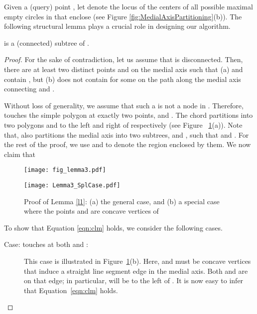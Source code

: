\documentclass[12pt]{llncs}
\begin{document}
Given a (query) point , let  denote the locus of the 
centers of all possible maximal empty circles in  that enclose  (see 
Figure \ref{fig:MedialAxisPartitioning}(b)). The following structural lemma 
plays a crucial role in designing our algorithm. 
\begin{lemma} \label{l1}
 is a (connected) subtree of .
\end{lemma}
\begin{proof}
For the sake of contradiction, let us assume that  is disconnected. Then, there 
are at least two distinct  points  and  on the medial axis such that 
(a)  and  contain , but (b)  
does not contain  for some   on the path along the medial axis connecting 
 and .   

Without loss of generality, we assume that such a  is not a node in . 
Therefore,  touches the simple polygon  at exactly two points, 
 and . The chord  partitions  into two polygons  and 
 to the left and right of  respectively (see Figure~
\ref{fig:fig_lemma3}(a)). 
Note that,  also partitions the medial axis into two subtrees,  and 
, 
such that  and . For the rest of the proof, 
we use  and  to denote the region enclosed by  
them. We now claim that 




\begin{figure}[ht]
\begin{minipage}[b]{0.57\linewidth}
\centering
\texttt{[image: fig\_lemma3.pdf]}
\end{minipage}
\hspace{0.5cm}
\begin{minipage}[b]{0.37\linewidth}
\centering
\texttt{[image: Lemma3\_SplCase.pdf]}
\end{minipage}
\caption{Proof of Lemma \ref{l1}: (a) the general case, and (b) a special 
case where the points  and  are concave vertices of }
\label{fig:fig_lemma3}
\end{figure}


To show that Equation \ref{eqn:clm} holds, we consider the following cases.


\begin{description}
\item[Case:  touches  at both  and :] 
This case is illustrated in Figure~\ref{fig:fig_lemma3}(b). Here,  and  
must be concave vertices that induce a straight line segment edge in the medial 
axis. Both  and  are on that edge; in particular,  will be to the 
left of . It is now easy to infer that Equation~\ref{eqn:clm} holds.


\end{description}
\end{proof}
\end{document}
